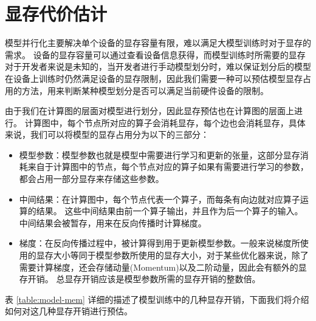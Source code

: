 \section{显存代价估计}
\label{sec:mem}
模型并行化主要解决单个设备的显存容量有限，难以满足大模型训练时对于显存的需求。
设备的显存容量可以通过查看设备信息获得，而模型训练时所需要的显存对于开发者来说是未知的，当开发者进行手动模型划分时，难以保证划分后的模型在设备上训练时仍然满足设备的显存限制，因此我们需要一种可以预估模型显存占用的方法，用来判断某种模型划分是否可以满足当前硬件设备的限制。



由于我们在计算图的层面对模型进行划分，因此显存预估也在计算图的层面上进行。
计算图中，每个节点所对应的算子会消耗显存，每个边也会消耗显存，具体来说，我们可以将模型的显存占用分为以下的三部分：
\begin{itemize}
	\item 模型参数：模型参数也就是模型中需要进行学习和更新的张量，这部分显存消耗来自于计算图中的节点，每个节点对应的算子如果有需要进行学习的参数，都会占用一部分显存来存储这些参数。
	\item 中间结果：在计算图中，每个节点代表一个算子，而每条有向边就对应算子运算的结果。
	这些中间结果由前一个算子输出，并且作为后一个算子的输入。中间结果会被暂存，用来在反向传播时计算梯度。
	\item 梯度：在反向传播过程中，被计算得到用于更新模型参数。一般来说梯度所使用的显存大小等同于模型参数所使用的显存大小，对于某些优化器来说，除了需要计算梯度，还会存储动量(Momentum)以及二阶动量，因此会有额外的显存开销。
	总显存开销应该是模型参数所需的显存开销的整数倍。
\end{itemize}

表 \ref{table:model-mem} 详细的描述了模型训练中的几种显存开销，下面我们将介绍如何对这几种显存开销进行预估。


